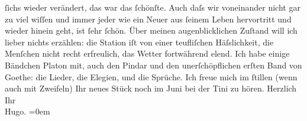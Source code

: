 \begin{ledgroupsized}[t]{13cm}
                    ſichs wieder verändert, das war das ſchönſte. \label{LL435-1v}Auch daſs wir voneinander nicht gar zu viel wiſſen und
                        immer  jeder {\pb}wie ein Neuer aus ſeinem
                        Leben hervortritt und wieder hinein geht, ist ſehr ſchön.\label{LL435-1h}\pend
           \pstart
           Über meinen augenblicklichen Zuſtand will ich lieber nichts erzählen: die Station
                    iſt von einer teufliſchen Häſslichkeit, die Menſchen nicht recht erfreulich, das
                    Wetter fortwährend elend. Ich habe einige Bändchen Platon mit, auch den Pindar und den
                    unerſchöpflichen erſten Band von Goethe: die
                    Lieder, die Elegien, und die Sprüche. Ich freue mich im ſtillen (wenn auch mit
                    Zweifeln) Ihr neues Stück
                    noch im Juni bei der Tini zu
                    hören.\pend
           \pstart
           Herzlich Ihr{\\[\baselineskip]}\spacefill\mbox{Hugo.}\pend
           \leftskip=0em{}          \endnumbering{}\end{ledgroupsized}  \newcommand{\dateiname}{L00545}\newcommand{\titel}{Hugo von Hofmannsthal an Arthur Schnitzler, 17. 5. [1896]}\newcommand{\editorInnen}{ Martin Anton Müller und Gerd-Hermann Susen}
            \footnotesize
\begin{ledgroupsized}[t]{11.5cm}
\end{ledgroupsized}
         
      
